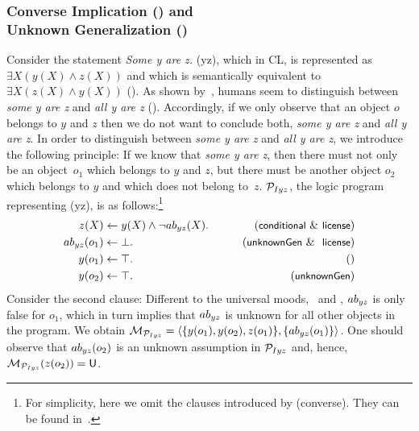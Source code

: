 \documentclass[12pt]{article}
\begin{document}
\subsubsection{Converse Implication (\converse) and \\ Unknown Generalization (\unknownGen)}
Consider the statement \textit{Some y are z.} ({\MI yz}), which in CL, is represented as $\exists X (y(X) \wedge z(X))$
and which is semantically equivalent to $\exists X(z(X) \wedge y(X))$ (\converse).
As shown by~\cite{khemlani:2012}, humans seem to
distinguish between \textit{some y are z} and \textit{all y are z} (\unknownGen).
Accordingly, if we only observe that an object $o$ belongs to $y$ and $z$ then we do not want to conclude both, \textit{some y are z} and \textit{all y are z}.
In order to distinguish between \textit{some y are z} and \textit{all y are z}, we introduce the following principle:  If we know that \textit{some y are z}, then there must not only be an object~$o_1$ which belongs to $y$ and $z$, but there must be another object $o_2$ which belongs to
$y$ and which does not belong to~$z$.
${\cal P}_{Iyz}$, the logic program representing (\MI yz), is as follows:\footnote{For simplicity, here we omit the clauses introduced by ({\footnotesize\textsf{converse}}). They can be found in~\cite{declare:2017}.}
\begin{align}
z(X) & \leftarrow y(X) \wedge \neg \Ab_{yz}(X). & \tag{\conditionals\ \&\ \licenses}\\
\Ab_{yz}(o_1) & \leftarrow  \bot. & \tag{\unknownGen\ \& \ \licenses}\\
y(o_1) & \leftarrow  \top. & \tag{} \\
y(o_2) & \leftarrow  \top. & \tag{\unknownGen} 
\end{align}
Consider the second clause: Different to the universal moods, \ME\ and \MA, $ab_{yz}$ is only false for $o_1$, which in turn implies that 
$ab_{yz}$ is unknown for all other objects in the program.
We obtain ${\cal M}_{{\cal P}_{Iyz}}= \langle \{y(o_1), y(o_2), z(o_1)\}, \{ab_{yz}(o_1)\} \rangle$.
One should observe that  $ab_{yz}(o_2)$ is an unknown assumption in
${\cal P}_{Iyz}$ and,
hence, ${\cal M}_{{\cal P}_{Iyz}}(z(o_2)) = \mathsf{U}$.
\end{document}
